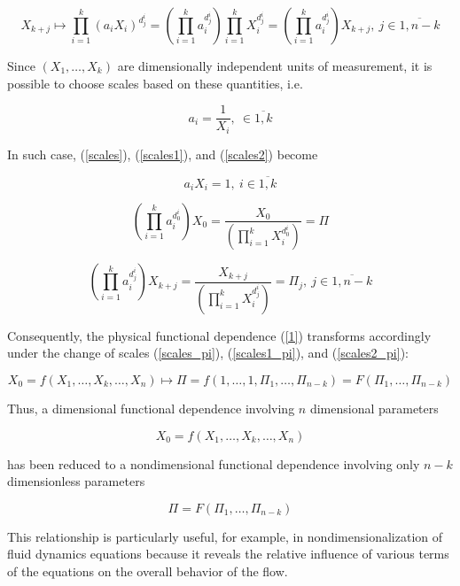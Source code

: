 \begin{equation} \label{scales2}
 X_{k+j} \mapsto \prod \limits_{i=1}^{k} (a_iX_i)^{d_j^i} = (\prod \limits_{i=1}^{k} a_i^{d_j^i}) \prod \limits_{i=1}^{k} X_i^{d_j^i} = (\prod \limits_{i=1}^{k} a_i^{d_j^i}) X_{k+j},~ j \in \overline{1,n-k}
\end{equation}

Since $(X_1, \hdots, X_k)$ are dimensionally independent units of measurement, it is possible to choose scales based on these quantities, i.e.

$$ a_i = \frac{1}{X_i},~ \in \overline{1,k} $$

In such case, (\ref{scales}), (\ref{scales1}), and (\ref{scales2}) become

\begin{equation} \label{scales_pi}
a_i X_i = 1,~ i \in \overline{1,k} 
\end{equation}

\begin{equation} \label{scales1_pi}
(\prod \limits_{i=1}^{k} a_i^{d_0^i}) X_0 = \frac{X_0}{(\prod \limits_{i=1}^{k} X_i^{d_0^i})} = \Pi
\end{equation}

\begin{equation} \label{scales2_pi}
(\prod \limits_{i=1}^{k} a_i^{d_j^i}) X_{k+j} = \frac{X_{k+j}}{(\prod \limits_{i=1}^{k} X_i^{d_j^i})} = \Pi_j,~ j \in \overline{1,n-k}
\end{equation}

Consequently, the physical functional dependence (\ref{1}) transforms accordingly under the change of scales (\ref{scales_pi}), (\ref{scales1_pi}), and (\ref{scales2_pi}):

$$ X_0 = f(X_1, \hdots, X_k, \hdots, X_n) \mapsto \Pi = f(1, \hdots, 1, \Pi_1, \hdots, \Pi_{n-k}) = F(\Pi_1, \hdots, \Pi_{n-k})$$

Thus, a dimensional functional dependence involving $n$ dimensional parameters

$$X_0 = f(X_1, \hdots, X_k, \hdots, X_n)$$

has been reduced to a nondimensional functional dependence involving only $n-k$ dimensionless parameters

$$ \Pi = F(\Pi_1, \hdots, \Pi_{n-k}) $$

This relationship is particularly useful, for example, in nondimensionalization of fluid dynamics equations because it reveals the relative influence of various terms of the equations on the overall behavior of the flow.


% 
% 
% 
